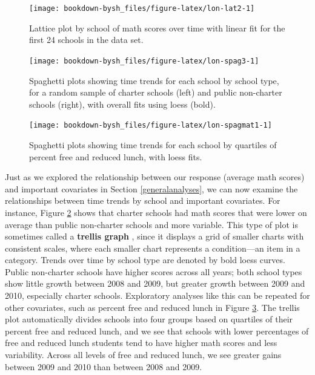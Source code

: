 \documentclass[
]{krantz}
\begin{document}
\begin{figure}

{\centering \texttt{[image: bookdown-bysh\_files/figure-latex/lon-lat2-1]} 

}

\caption{ Lattice plot by school of math scores over time with linear fit for the first 24 schools in the data set.}\label{fig:lon-lat2}
\end{figure}

\begin{figure}

{\centering \texttt{[image: bookdown-bysh\_files/figure-latex/lon-spag3-1]} 

}

\caption{Spaghetti plots showing time trends for each school by school type, for a random sample of charter schools (left) and public non-charter schools (right), with overall fits using loess (bold).}\label{fig:lon-spag3}
\end{figure}

\begin{figure}

{\centering \texttt{[image: bookdown-bysh\_files/figure-latex/lon-spagmat1-1]} 

}

\caption{Spaghetti plots showing time trends for each school by quartiles of percent free and reduced lunch, with loess fits.}\label{fig:lon-spagmat1}
\end{figure}

Just as we explored the relationship between our response (average math scores) and important covariates in Section \ref{generalanalyses}, we can now examine the relationships between time trends by school and important covariates. For instance, Figure \ref{fig:lon-spag3} shows that charter schools had math scores that were lower on average than public non-charter schools and more variable. This type of plot is sometimes called a \textbf{trellis graph} , since it displays a grid of smaller charts with consistent scales, where each smaller chart represents a condition---an item in a category. Trends over time by school type are denoted by bold loess curves. Public non-charter schools have higher scores across all years; both school types show little growth between 2008 and 2009, but greater growth between 2009 and 2010, especially charter schools. Exploratory analyses like this can be repeated for other covariates, such as percent free and reduced lunch in Figure \ref{fig:lon-spagmat1}. The trellis plot automatically divides schools into four groups based on quartiles of their percent free and reduced lunch, and we see that schools with lower percentages of free and reduced lunch students tend to have higher math scores and less variability. Across all levels of free and reduced lunch, we see greater gains between 2009 and 2010 than between 2008 and 2009.
\end{document}
